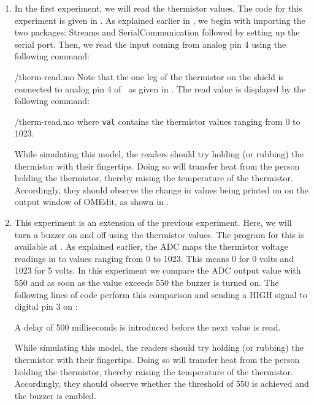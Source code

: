 \begin{enumerate}
  \item In the first experiment, we will read the thermistor values. The code for this experiment is given in
        . As explained earlier in ,
        we begin with importing the two packages: Streams and SerialCommunication followed
        by setting up the serial port. Then, we read the input coming from analog pin 4 using the
        following command:
        
        {\LocTHERMOpenModelicacode/therm-read.mo} Note that the one leg of the thermistor on
        the shield is connected to analog pin 4 of \arduino\,
        as given in . The read value is displayed
        by the following command:
        
        {\LocTHERMOpenModelicacode/therm-read.mo} where {\tt val} contains
        the thermistor values ranging from 0 to 1023.

        While simulating this model,
        the readers should try holding (or rubbing) the thermistor with their fingertips.
        Doing so will transfer heat from the person holding the
        thermistor, thereby raising the temperature of the thermistor.
        Accordingly, they should observe the change in values being printed on on the output window of OMEdit, as shown in .

  \item This experiment is an extension of the previous experiment. Here,
        we will turn a buzzer on and off using the thermistor values.
        The program for this is available at
        .  As explained earlier,
        the ADC maps the thermistor voltage readings in to values
        ranging from 0 to 1023. This means 0 for 0 volts and 1023 for 5
        volts. In this experiment we compare the ADC output value with 550
        and as soon as the value exceeds 550 the buzzer is turned on. The following lines of code perform this
        comparison and sending a {HIGH} signal to digital pin 3 on \arduino:
        
        A delay of 500 milliseconds is introduced
        before the next value is read. 

        While simulating this model, 
        the readers should try holding (or rubbing) the thermistor with their fingertips.
        Doing so will transfer heat from the person holding the
        thermistor, thereby raising the temperature of the thermistor.
        Accordingly, they should observe whether the threshold of 550 is achieved
        and the buzzer is enabled.


\end{enumerate}
